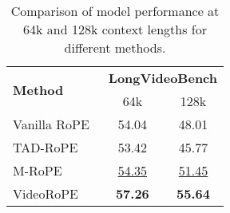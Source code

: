 \renewcommand{\arraystretch}{1.1}  %
\begin{table}[!h]
\setlength\tabcolsep{5pt}  %
\centering
\normalsize
\caption{Comparison of model performance at 64k and 128k context lengths for different methods.}
\label{tab:128k-appendix}
\vspace{2mm}
\begin{tabular}{lcc}
\hline
\multirow{2}{*}{\textbf{Method}} & \multicolumn{2}{c}{\textbf{LongVideoBench}} \\ 
\cmidrule(lr){2-3} 
 & 64k & 128k \\ \hline
Vanilla RoPE~\cite{su2024roformer} & 54.04 & 48.01 \\
TAD-RoPE~\cite{gao2024tc} & 53.42 & 45.77 \\
M-RoPE~\cite{wang2024qwen2} & \underline{54.35} & \underline{51.45} \\
\hline
\rowcolor[HTML]{F2F3F5}  %
VideoRoPE & \textbf{57.26} & \textbf{55.64} \\ \bottomrule
\end{tabular}
\end{table}

